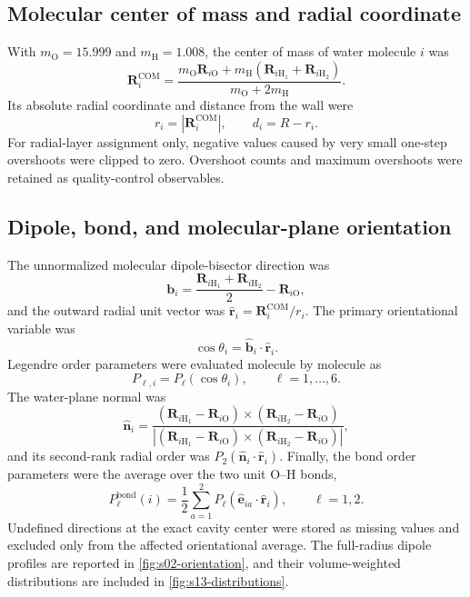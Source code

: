 \documentclass[11pt]{article}
\newcommand{\COM}{\mathrm{COM}}
\begin{document}
\subsection{Molecular center of mass and radial coordinate}

With \(m_{\mathrm O}=15.999\) and \(m_{\mathrm H}=1.008\), the center of mass
of water molecule \(i\) was
\begin{equation}
 \bm R_i^{\COM} =
 \frac{m_{\mathrm O}\bm R_{i\mathrm O}
 +m_{\mathrm H}(\bm R_{i\mathrm H_1}+\bm R_{i\mathrm H_2})}
 {m_{\mathrm O}+2m_{\mathrm H}}.
 \label{eq:com}
\end{equation}
Its absolute radial coordinate and distance from the wall were
\begin{equation}
 r_i=\left|\bm R_i^{\COM}\right|,
 \qquad d_i=R-r_i.
 \label{eq:wall-distance}
\end{equation}
For radial-layer assignment only, negative values caused by very small
one-step overshoots were clipped to zero.  Overshoot counts and maximum
overshoots were retained as quality-control observables.

\subsection{Dipole, bond, and molecular-plane orientation}

The unnormalized molecular dipole-bisector direction was
\begin{equation}
 \bm b_i=\frac{\bm R_{i\mathrm H_1}+\bm R_{i\mathrm H_2}}{2}
 -\bm R_{i\mathrm O},
\end{equation}
and the outward radial unit vector was
\(\hat{\bm r}_i=\bm R_i^{\COM}/r_i\).  The primary orientational variable was
\begin{equation}
 \cos\theta_i=\hat{\bm b}_i\cdot\hat{\bm r}_i.
\end{equation}
Legendre order parameters were evaluated molecule by molecule as
\begin{equation}
 P_{\ell,i}=P_\ell(\cos\theta_i),\qquad \ell=1,\ldots,6.
 \label{eq:legendre}
\end{equation}
The water-plane normal was
\begin{equation}
 \hat{\bm n}_i=
 \frac{(\bm R_{i\mathrm H_1}-\bm R_{i\mathrm O})\times
       (\bm R_{i\mathrm H_2}-\bm R_{i\mathrm O})}
 {|(\bm R_{i\mathrm H_1}-\bm R_{i\mathrm O})\times
       (\bm R_{i\mathrm H_2}-\bm R_{i\mathrm O})|},
\end{equation}
and its second-rank radial order was
\(P_2(\hat{\bm n}_i\cdot\hat{\bm r}_i)\).  Finally, the bond order parameters
were the average over the two unit O--H bonds,
\begin{equation}
 P_\ell^{\mathrm{bond}}(i)=\frac12\sum_{a=1}^{2}
 P_\ell(\hat{\bm e}_{ia}\cdot\hat{\bm r}_i),\qquad \ell=1,2.
 \label{eq:bond-order}
\end{equation}
Undefined directions at the exact cavity center were stored as missing values
and excluded only from the affected orientational average.
The full-radius dipole profiles are reported in \cref{fig:s02-orientation},
and their volume-weighted distributions are included in
\cref{fig:s13-distributions}.
\end{document}
